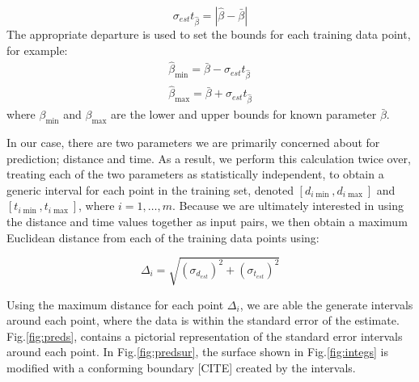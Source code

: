 \documentclass[letterpaper, 10 pt, conference]{ieeeconf}  %
\begin{document}
\begin{equation}
    \sigma_{est}t_{\hat{\beta}} = |\hat{\beta}-\bar{\beta}|
\end{equation}
The appropriate departure is used to set the bounds for each training data point, for example:
\begin{align}
    \hat{\beta}_{\min} = \bar{\beta} - \sigma_{est}t_{\hat{\beta}} \nonumber \\
    \hat{\beta}_{\max} = \bar{\beta} + \sigma_{est}t_{\hat{\beta}}
\end{align}
where $\beta_{\min}$ and $\beta_{\max}$ are the lower and upper bounds for known parameter $\bar{\beta}$.

In our case, there are two parameters we are primarily concerned about for prediction; distance and time. As a result, we perform this calculation twice over, treating each of the two parameters as statistically independent, to obtain a generic interval for each point in the training set, denoted $[d_{i\min},d_{i\max}]$ and $[t_{i\min},t_{i\max}]$, where $i=1,\ldots,m$. Because we are ultimately interested in using the distance and time values together as input pairs, we then obtain a maximum Euclidean distance from each of the training data points using:

\begin{equation}
    \Delta_i = \sqrt{(\sigma_{d_{est}})^2+(\sigma_{t_{est}})^2}
\end{equation}

Using the maximum distance for each point $\Delta_i$, we are able the generate intervals around each point, where the data is within the standard error of the estimate. Fig.\ref{fig:preds}, contains a pictorial representation of the standard error intervals around each point. In Fig.\ref{fig:predsur}, the surface shown in Fig.\ref{fig:integs} is modified with a conforming boundary [CITE] created by the intervals.
\end{document}

